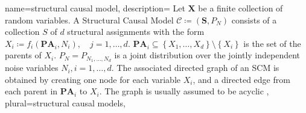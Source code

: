{%
name={structural causal model},
description={
Let $\boldsymbol{X}$ be a finite collection of random
variables. A Structural Causal Model $\mathcal{C}
	\coloneq(\boldsymbol{S}, P_N)$ consists of a collection $S$ of
$d$ structural assignments with the form
$X_i\coloneq f_i(\mathbf{PA}_i, N_i),\quad j=1,\dots,d$.
$\mathbf{PA}_i\subseteq\left\{X_1,\dots,X_d\right\} \setminus
	\left\{X_i\right\}$ is the set of the parents of $X_i$.
$P_N=P_{N_1,\dots,N_d}$ is a joint distribution over the
jointly independent noise variables $N_i,i=1,\dots,d$. The
associated directed graph of an SCM is obtained by creating one
node for each variable $X_i$, and a directed edge from each
parent in $\mathbf{PA}_i$ to $X_i$.
The graph is usually assumed to be acyclic
},
plural={structural causal models},%
}
